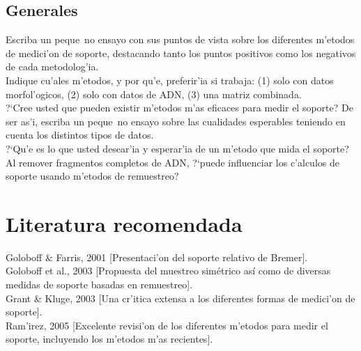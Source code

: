 \subsection{Generales}
\noindent
Escriba un peque~no ensayo con sus puntos de vista sobre los diferentes m'etodos de medici'on de soporte, destacando tanto los puntos positivos como los negativos de cada metodolog'ia.\\
Indique cu'ales m'etodos, y por qu'e, preferir'ia si trabaja: (1) solo con datos morfol'ogicos, (2) solo con datos de ADN, (3) una matriz combinada.\\
?`Cree usted que pueden existir m'etodos m'as eficaces para medir el soporte? De ser as'i, escriba un peque~no ensayo sobre las cualidades esperables teniendo en cuenta los distintos tipos de datos.\\
?`Qu'e es lo que usted desear'ia y esperar'ia de un m'etodo que mida el soporte?\\
 Al remover fragmentos completos de ADN, ?`puede influenciar los c'alculos de soporte usando m'etodos de remuestreo?
\section{Literatura recomendada}
\noindent
Goloboff \& Farris, 2001 [Presentaci'on del soporte relativo de Bremer].\\
Goloboff et al., 2003 [Propuesta del muestreo sim\'etrico as\'i como de diversas medidas de soporte basadas en remuestreo].\\
Grant \& Kluge, 2003 [Una cr'itica extensa a los diferentes formas de medici'on de soporte].\\
Ram'irez, 2005 [Excelente revisi'on de los diferentes m'etodos para medir el soporte, incluyendo los m'etodos m'as recientes].